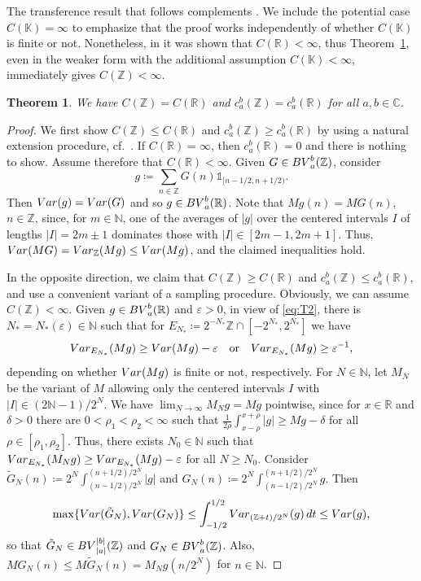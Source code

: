 \documentclass[leqno,11pt]{amsart}
\numberwithin{equation}{section}
\newtheorem{theorem}{Theorem}
\numberwithin{theorem}{section}
\newcommand{\KK}{\mathbb{K}}
\newcommand{\RR}{\mathbb{R}}
\newcommand{\ZZ}{\mathbb{Z}}
\newcommand{\CC}{\mathbb{C}}
\newcommand{\NN}{\mathbb{N}}
\newcommand{\Var}{{\rm Var}}
\newcommand{\BV}{{\rm BV}}
\newcommand{\ind}[1]{{\mathds{1}_{{#1}}}}
\begin{document}
	The transference result that follows complements \cite[Proposition~1.4]{BW}. We include the potential case $C(\KK) = \infty$ to emphasize that the proof works independently of whether $C(\KK)$ is finite or not. Nonetheless, in \cite{Kurka2010} it was shown that $C(\RR) < \infty$, thus Theorem~\ref{T2}, even in the weaker form with the additional assumption $C(\KK) < \infty$, immediately gives $C(\ZZ) < \infty$.  
	
	\begin{theorem} \label{T2}
		We have $C(\ZZ) = C(\RR)$ and $c_a^b(\ZZ) = c_a^b(\RR)$ for all $a, b \in \CC$.
	\end{theorem}
	
	\begin{proof}
	We first show $C(\ZZ) \leq C(\RR)$ and $c_a^b(\ZZ) \geq c_a^b(\RR)$ by using a natural extension procedure, cf.~\cite[Lemma~4.1]{BW}.
	If $C(\RR)=\infty$, then $c_a^b(\RR)=0$ and there is nothing to show. Assume therefore that $C(\RR)<\infty$.
	Given $G \in \BV_a^b(\ZZ)$, consider
	\[
	g \coloneqq \sum_{n \in \ZZ} G(n) \ind{[n-1/2,n+1/2)}.
	\]
	Then $\Var(g) = \Var(G)$ and so $g \in \BV_a^b(\RR)$. Note that $Mg(n) = MG(n)$, $n \in \ZZ$, since, for $m \in \NN$, one of the averages of $|g|$ over the centered intervals $I$
	of lengths $|I| = 2m \pm 1$ dominates those with $|I| \in [2m-1,2m+1]$. Thus, $\Var(MG)=\Var_\ZZ (Mg) \le \Var(Mg)$, and the claimed inequalities hold.
	
	In the opposite direction, we claim that $C(\ZZ)\geq C(\RR)$ and $c_a^b(\ZZ)\leq c_a^b(\RR)$, and use a convenient variant of a sampling procedure.  
	Obviously, we can assume $C(\ZZ)<\infty$.
	Given $g \in \BV_a^b(\RR)$ and $\varepsilon > 0$, in view of \eqref{eq:T2}, there is $N_*=N_*(\varepsilon) \in \NN$ such that for $E_{N_*} \coloneqq 2^{-N_*}\ZZ \cap [-2^{N_*},2^{N_*}]$ we have
	\begin{equation} \label{eq:T3}
	\Var_{E_{N_*}} (Mg) \geq \Var(Mg) - \varepsilon
	\quad \text{or} \quad \Var_{E_{N_*}} (Mg) \geq \varepsilon^{-1},
	\end{equation}
	depending on whether $\Var(Mg)$ is finite or not, respectively. For $N \in \NN$, let $M_{N}$ be the variant of $M$ allowing only the centered intervals $I$ with $|I| \in (2\NN-1)/2^N$. We have $\lim_{N \to \infty }M_N g = M g$ pointwise, since for $x \in \RR$ and $\delta > 0$ there are $0 < \rho_1 < \rho_2 < \infty$ such that $\frac{1}{2\rho} \int_{x-\rho}^{x+\rho} |g| \geq M g - \delta$ for all $\rho \in [\rho_1, \rho_2]$. Thus, there exists $N_0 \in \NN$ such that
	$
	\Var_{E_{N_*}} (M_{N} g) \geq \Var_{E_{N_*}} (M g) - \varepsilon
	$
	for all $N \geq N_0$.
	Consider $\tilde G_N(n) \coloneqq 2^N \int_{(n-1/2)/2^N}^{(n+1/2)/2^N} |g|$ and $G_N(n) \coloneqq 2^N \int_{(n-1/2)/2^N}^{(n+1/2)/2^N} g$. Then
	\begin{equation} \label{eq:T4}
	\max\{\Var(\tilde G_N), \Var(G_N)\} \leq \int_{-1/2}^{1/2} \Var_{(\ZZ + t)/2^N } (g) \, {\rm d}t \leq \Var(g),
	\end{equation}
	so that $\tilde G_N \in \BV_{|a|}^{|b|}(\ZZ)$ and $G_N \in \BV_a^b(\ZZ)$. Also, $MG_N(n) \leq M\tilde G_N(n) = M_N g(n/2^N)$ for $n \in \NN$. 
	

\end{proof}
\end{document}
